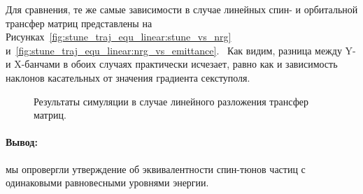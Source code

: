 Для сравнения, те же самые зависимости в случае линейных спин- и орбитальной трансфер матриц представлены на Рисунках~\ref{fig:stune_traj_equ_linear:stune_vs_nrg} и~\ref{fig:stune_traj_equ_linear:nrg_vs_emittance}.  Как видим, разница между Y- и X-банчами в обоих случаях практически исчезает, равно как и зависимость наклонов касательных от значения градиента секступоля.

\begin{figure}[h]
	\centering
\caption{Результаты симуляции в случае линейного разложения трансфер матриц.}
\end{figure}

\paragraph{Вывод:} мы опровергли утверждение об эквивалентности спин-тюнов частиц с одинаковыми равновесными уровнями энергии. 

\clearpage
